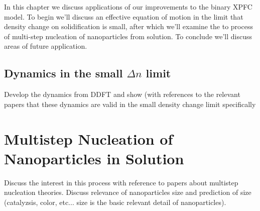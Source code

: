 \label{chapter:applications}

In this chapter we discuss applications of our improvements to the binary XPFC model.
To begin we'll discuss an effective equation of motion in the limit that density 
change on solidification is small, after which we'll examine the to process of
multi-step nucleation of nanoparticles from solution. To conclude we'll discuss
areas of future application.

\subsection{Dynamics in the small $\Delta n$ limit} %

{
    \color{ForestGreen} Develop the dynamics from DDFT and show (with references
    to the relevant papers that these dynamics are valid in the small density
    change limit specifically
}

\section{Multistep Nucleation of Nanoparticles in Solution} %

{
    \color{ForestGreen} Discuss the interest in this process with reference to 
    papers about multistep nucleation theories. Discuss relevance of nanoparticles
    size and prediction of size (catalyzsis, color, etc... size is the basic relevant
    detail of nanoparticles).
}


